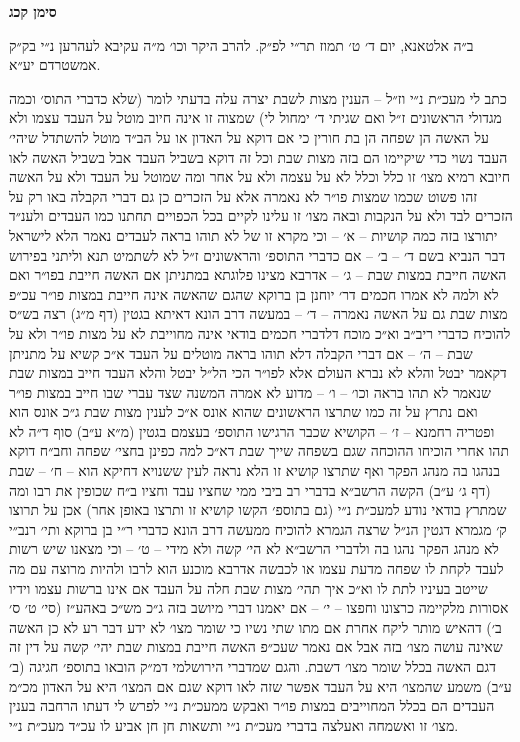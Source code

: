 \documentclass[12pt, openany]{book}
\newcommand{\chapname}{}
\newcommand{\newchap}[1]{
	\addcontentsline{toc}{chapter}{#1}
	\renewcommand{\chapname}{#1}
		\begin{center}
			\textbf{%
\fontsize{16pt}{16pt}\selectfont
				#1}
		\end{center}
}
\begin{document}
\newchap{סימן קכג}
\begin{multicols}{2}
ב״ה אלטאנא, יום ד׳ ט׳ תמוז תר״י לפ״ק. להרב היקר וכו׳ מ״ה עקיבא לעהרען נ״י בק״ק אמשטרדם יע״א.\\\vspace{0pt}

כתב לי מעכ״ת נ״י וז״ל – הענין מצות לשבת יצרה עלה בדעתי לומר (שלא כדברי התוס׳ וכמה מגדולי הראשונים ז״ל ואם שגיתי ד׳ ימחול לי) שמצוה זו אינה חיוב מוטל על העבד עצמו ולא על האשה הן שפחה הן בת חורין כי אם דוקא על האדון או על הב״ד מוטל להשתדל שיהי׳ העבד נשוי כדי שיקיימו הם בזה מצות שבת וכל זה דוקא בשביל העבד אבל בשביל האשה לאו חיובא רמיא מצו׳ זו כלל וכלל לא על עצמה ולא על אחר ומה שמוטל על העבד ולא על האשה זהו פשוט שכמו שמצות פו״ר לא נאמרה אלא על הזכרים כן גם דברי הקבלה באו רק על הזכרים לבד ולא על הנקבות ובאה מצו׳ זו עלינו לקיים בכל הכפויים תחתנו כמו העבדים ולענ״ד יתורצו בזה כמה קושיות – א׳ – וכי מקרא זו של לא תוהו בראה לעבדים נאמר הלא לישראל דבר הנביא בשם ד׳ – ב׳ – אם כדברי התוספ׳ והראשונים ז״ל לא לשתמיט תנא וליתני בפירוש האשה חייבת במצות שבת – ג׳ – אדרבא מצינו פלוגתא במתניתן אם האשה חייבת בפו״ר ואם לא ולמה לא אמרו חכמים דר׳ יוחנן בן ברוקא שהגם שהאשה אינה חייבת במצות פו״ר עכ״פ מצות שבת גם על האשה נאמרה – ד׳ – במעשה דרב הונא דאיתא בגטין (דף מ״ג) רצה בש״ס להוכיח כדברי ריב״ב וא״כ מוכח דלדברי חכמים בודאי אינה מחוייבת לא על מצות פו״ר ולא על שבת – ה׳ – אם דברי הקבלה דלא תוהו בראה מוטלים על העבד א״כ קשיא על מתניתן דקאמר יבטל והלא לא נברא העולם אלא לפו״ר הכי הל״ל יבטל והלא העבד חייב במצות שבת שנאמר לא תהו בראה וכו׳ – ו׳ – מדוע לא אמרה המשנה שצד עברי שבו חייב במצות פו״ר ואם נתרץ על זה כמו שתרצו הראשונים שהוא אונס א״כ לענין מצות שבת ג״כ אונס הוא ופטריה רחמנא – ז׳ – הקושיא שכבר הרגישו התוספ׳ בעצמם בגטין (מ״א ע״ב) סוף ד״ה לא תהו אחרי הוכיחו ההוכחה שגם בשפחה שייך שבת דא״כ למה כפינן בחצי׳ שפחה וחב״ח דוקא בנהגו בה מנהג הפקר ואף שתרצו קושיא זו הלא נראה לעין ששנויא דחיקא הוא – ח׳ – שבת (דף ג׳ ע״ב) הקשה הרשב״א בדברי רב ביבי ממי שחציו עבד וחציו ב״ח שכופין את רבו ומה שמתרץ בודאי נודע למעכ״ת נ״י (גם בתוספ׳ הקשו קושיא זו ותרצו באופן אחר) אכן על תרוצו ק׳ מגמרא דגטין הנ״ל שרצה הגמרא להוכיח ממעשה דרב הונא כדברי ר״י בן ברוקא ותי׳ רנב״י לא מנהג הפקר נהגו בה ולדברי הרשב״א לא הי׳ קשה ולא מידי – ט׳ – וכי מצאנו שיש רשות לעבד לקחת לו שפחה מדעת עצמו או לכבשה אדרבא מוכנע הוא לרבו ולהיות מרוצה עם מה שייטב בעיניו לתת לו וא״כ איך תהי׳ מצות שבת חלה על העבד אם אינו ברשות עצמו וידיו אסורות מלקיימה כרצונו וחפצו – י׳ – אם יאמנו דברי מיושב בזה ג״כ מש״כ באהע״ז (סי׳ ט׳ ס׳ ב׳) דהאיש מותר ליקח אחרת אם מתו שתי נשיו כי שומר מצו׳ לא ידע דבר רע לא כן האשה שאינה עושה מצו׳ בזה אבל אם נאמר שעכ״פ האשה חייבת במצות שבת יהי׳ קשה על דין זה דגם האשה בכלל שומר מצו׳ דשבת. והגם שמדברי הירושלמי דמ״ק הובאו בתוספ׳ חגיגה (ב׳ ע״ב) משמע שהמצו׳ היא על העבד אפשר שזה לאו דוקא שגם אם המצו׳ היא על האדון מכ״מ העבדים הם בכלל המחוייבים במצות פו״ר ואבקש ממעכ״ת נ״י לפרש לי דעתו הרחבה בענין מצו׳ זו ואשמחה ואעלצה בדברי מעכ״ת נ״י ותשאות חן חן אביע לו עכ״ד מעכ״ת נ״י.\\\vspace{0pt}


\end{multicols}
\end{document}

